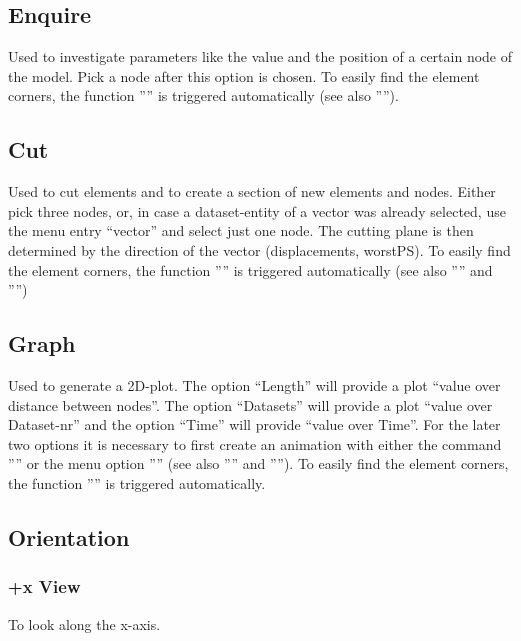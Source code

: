 \documentclass{article}
\begin{document}
\subsection{\label{Enquire}Enquire}
Used to investigate parameters like the value and the position of a certain node of the model. Pick a node after this option is chosen. To easily find the element corners, the function '''' is triggered automatically (see also '''').

\subsection{\label{Cut}Cut}
Used to cut elements and to create a section of new elements and nodes. Either pick three nodes, or, in case a dataset-entity of a vector was already selected, use the menu entry ``vector'' and select just one node. The cutting plane is then determined by the direction of the vector (displacements, worstPS). To easily find the element corners, the function '''' is triggered automatically (see also '''' and '''')

\subsection{\label{Graph}Graph}
Used to generate a 2D-plot. The option ``Length'' will provide a plot ``value over distance between nodes''. The option ``Datasets'' will provide a plot ``value over Dataset-nr'' and the option ``Time'' will provide ``value over Time''. For the later two options it is necessary to first create an animation with either the command '''' or the menu option '''' (see also '''' and ''''). To easily find the element corners, the function '''' is triggered automatically.

\subsection{\label{Orientation}Orientation}
\subsubsection{+x View}
To look along the x-axis.
\end{document}
